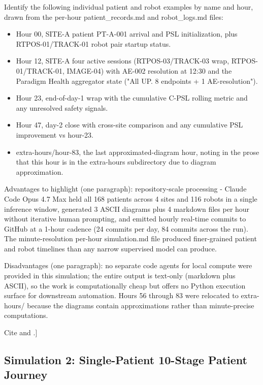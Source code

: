 Identify the following individual patient and robot examples by name and
hour, drawn from the per-hour patient\_records.md and robot\_logs.md files:
\begin{itemize}[leftmargin=*]
\item Hour 00, SITE-A patient PT-A-001 arrival and PSL initialization,
plus RTPOS-01/TRACK-01 robot pair startup status.
\item Hour 12, SITE-A four active sessions (RTPOS-03/TRACK-03 wrap,
RTPOS-01/TRACK-01, IMAGE-04) with AE-002 resolution at 12:30 and the
Paradigm Health aggregator state ("All UP. 8 endpoints + 1 AE-resolution").
\item Hour 23, end-of-day-1 wrap with the cumulative C-PSL rolling
metric and any unresolved safety signals.
\item Hour 47, day-2 close with cross-site comparison and any cumulative
PSL improvement vs hour-23.
\item extra-hours/hour-83, the last approximated-diagram hour, noting in
the prose that this hour is in the extra-hours subdirectory due to
diagram approximation.
\end{itemize}

Advantages to highlight (one paragraph): repository-scale processing -
Claude Code Opus 4.7 Max held all 168 patients across 4 sites and 116
robots in a single inference window, generated 3 ASCII diagrams plus 4
markdown files per hour without iterative human prompting, and emitted
hourly real-time commits to GitHub at a 1-hour cadence (24 commits per
day, 84 commits across the run). The minute-resolution per-hour
simulation.md file produced finer-grained patient and robot timelines
than any narrow supervised model can produce.

Disadvantages (one paragraph): no separate code agents for local compute
were provided in this simulation; the entire output is text-only (markdown
plus ASCII), so the work is computationally cheap but offers no Python
execution surface for downstream automation. Hours 56 through 83 were
relocated to extra-hours/ because the diagrams contain approximations
rather than minute-precise computations.

Cite \cite{kawchak_2026_19176370} and \cite{fda2026realtime}.]

\subsection{Simulation 2: Single-Patient 10-Stage Patient Journey}
\label{sec:results-sim2}

